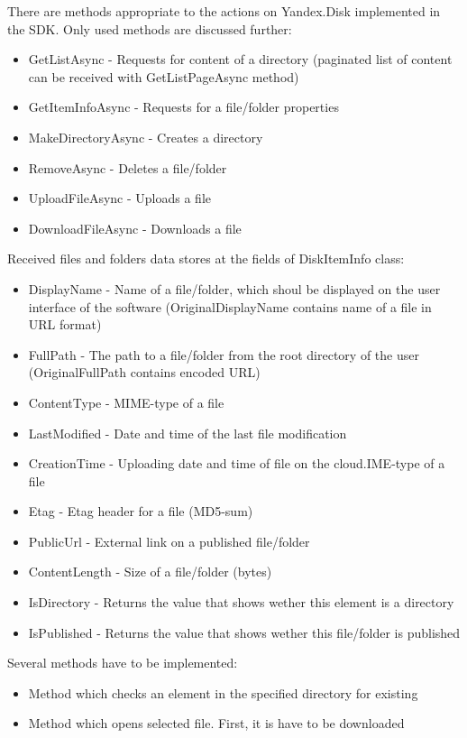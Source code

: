 \documentclass[12pt,journal,compsoc]{D:/Магистратура/English/bare_conf/IEEEtran}
\begin{document}
There are methods appropriate to the actions on Yandex.Disk implemented in the SDK. Only used methods are discussed further:
\begin{itemize}
\item GetListAsync - Requests for content of a directory (paginated list of content can be received with GetListPageAsync method)
\item GetItemInfoAsync - Requests for a file/folder properties
\item MakeDirectoryAsync - Creates a directory
\item RemoveAsync - Deletes a file/folder
\item UploadFileAsync - Uploads a file
\item DownloadFileAsync - Downloads a file
\end{itemize}

Received files and folders data stores at the fields of DiskItemInfo class:
\begin{itemize}
\item DisplayName - Name of a file/folder, which shoul be displayed on the user interface of the software (OriginalDisplayName contains name of a file in URL format)
\item FullPath - The path to a file/folder from the root directory of the user (OriginalFullPath contains encoded URL)
\item ContentType - MIME-type of a file
\item LastModified - Date and time of the last file modification 
\item CreationTime - Uploading date and time of file on the cloud.IME-type of a file
\item Etag - Etag header for a file (MD5-sum)
\item PublicUrl - External link on a published file/folder
\item ContentLength - Size of a file/folder (bytes)
\item IsDirectory - Returns the value that shows wether this element is a directory
\item IsPublished - Returns the value that shows wether this file/folder is published
\end{itemize}

Several methods have to be implemented:
\begin{itemize}
\item Method which checks an element in the specified directory for existing
\item Method which opens selected file. First, it is have to be downloaded
\end{itemize}
\end{document}
